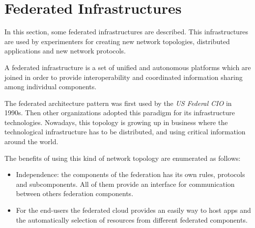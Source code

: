 \section{Federated Infrastructures}

In this section, some federated infrastructures are described. This
infrastructures are used by experimenters for creating new network topologies,
 distributed applications and new network protocols.

A federated infrastructure is a set of unified and autonomous platforms which
are joined in order to provide interoperability and coordinated
information sharing among individual components.

The federated architecture pattern was first used by the \emph{US Federal CIO} in
1990s. Then other organizations adopted this paradigm for its infrastructure
technologies. Nowadays, this topology is growing up in business where the
technological infrastructure has to be distributed, and using critical information around the world.

The benefits of using this kind of network topology are enumerated as follows:
\begin{itemize}
\item Independence: the components of the federation has its own rules,
  protocols and subcomponents. All of them provide an interface for
  communication between others federation components.
\item For the end-users the federated cloud provides an easily way to host apps
  and the automatically selection of resources from different federated components.
\end{itemize}


